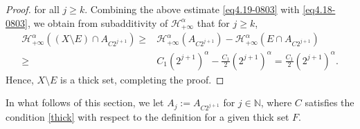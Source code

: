 \documentclass[10pt]{amsart}
\numberwithin{equation}{section}
\begin{document}
\begin{proof}
for all $j\geq k$.
Combining the above estimate \eqref{eq4.19-0803} with \eqref{eq4.18-0803},  we obtain from subadditivity of $\mathcal H^{\alpha}_{+\infty}$ that for $j\geq k$,
\begin{align*}
	\mathcal H^{\alpha}_{+\infty}((X\setminus E) \cap A_{C2^{j+1}}) \geq& \mathcal H^{\alpha}_{+\infty} ( A_{C2^{j+1}}) - \mathcal H^{\alpha}_{+\infty}( E\cap A_{C2^{j+1}})\\
\geq & C_1 (2^{j+1})^\alpha-\frac{C_1}{2}(2^{j+1})^\alpha=\frac{C_1}{2}(2^{j+1})^\alpha.
\end{align*}
 Hence, $X\setminus E$ is a thick set, completing the proof.
\end{proof}






 	In what follows of this section, we let  $A_j:=A_{C2^{j+1}}$ for $j\in\mathbb N$, where $C$ satisfies the condition \eqref{thick} with respect to the definition for a given thick set $F$.
\end{document}
